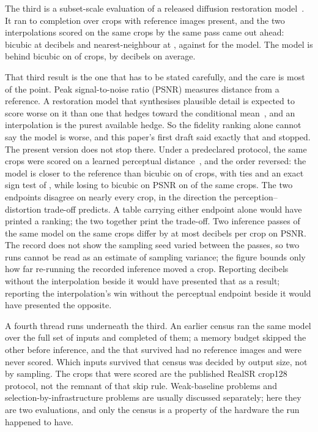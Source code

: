 The third is a subset-scale evaluation of a released diffusion restoration
model~\cite{releasedmodel}. It ran to completion over \SubsetN{} crops with
reference images present, and the two interpolations scored on the same crops by
the same pass came out ahead: bicubic at \BicubicPSNR{} decibels and
nearest-neighbour at \NearestPSNR{}, against \MethodPSNR{} for the model. The
model is behind bicubic on \LossesBicubic{} of \SubsetN{} crops, by
\GapBicubicAbs{} decibels on average.

That third result is the one that has to be stated carefully, and the care is
most of the point. Peak signal-to-noise ratio (PSNR) measures distance from a reference.
A restoration model that synthesises plausible detail is expected to score worse
on it than one that hedges toward the conditional
mean~\cite{blau2018perception,ledig2017srgan}, and an interpolation is the
purest available hedge. So the fidelity ranking alone cannot say the model is
worse, and this paper's first draft said exactly that and stopped. The present
version does not stop there. Under a predeclared protocol, the same \SubsetN{}
crops were scored on a learned perceptual distance~\cite{zhang2018lpips}, and
the order reversed: the model is closer to the reference than bicubic on
\LpipsWins{} of \SubsetN{} crops, with \LpipsTies{} ties and an exact sign test
of \LpipsSignP{}, while losing to bicubic on PSNR on \PsnrLossesLocal{} of the
same crops. The two endpoints disagree on nearly every crop, in the direction
the perception--distortion trade-off predicts. A table carrying either endpoint
alone would have printed a ranking; the two together print the trade-off. Two
inference passes of the same model on the same crops differ by at most
\NoiseMax{} decibels per crop on PSNR. The record does not show the sampling
seed varied between the passes, so two runs cannot be read as an estimate of
sampling variance; the figure bounds only how far re-running the recorded
inference moved a crop. Reporting \MethodPSNR{} decibels without the
interpolation beside it would have presented that as a result; reporting the
interpolation's win without the perceptual endpoint beside it would have
presented the opposite.

A fourth thread runs underneath the third. An earlier census ran the same model
over the full set of \CensusTotal{} inputs and completed \CensusRan{} of them; a
memory budget skipped the other \CensusSkipped{} before inference, and the
\CensusRan{} that survived had no reference images and were never scored. Which
inputs survived that census was decided by output size, not by sampling. The
\SubsetN{} crops that were scored are the published RealSR crop128 protocol, not
the remnant of that skip rule. Weak-baseline problems and selection-by-infrastructure
problems are usually discussed separately; here they are two evaluations, and
only the census is a property of the hardware the run happened to have.

